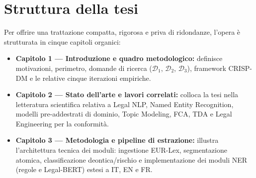 \documentclass[12pt,a4paper,oneside]{report}
\begin{document}
\clearpage

\section{Struttura della tesi}
Per offrire una trattazione compatta, rigorosa e priva di ridondanze, l'opera è strutturata in cinque capitoli organici:

\begin{itemize}
    \item \textbf{Capitolo 1 — Introduzione e quadro metodologico:} definisce motivazioni, perimetro, domande di ricerca ($\mathcal{D}_1$, $\mathcal{D}_2$, $\mathcal{D}_3$), framework CRISP-DM e le relative cinque iterazioni empiriche.
    
    \item \textbf{Capitolo 2 — Stato dell'arte e lavori correlati:} colloca la tesi nella letteratura scientifica relativa a Legal NLP, Named Entity Recognition, modelli pre-addestrati di dominio, Topic Modeling, FCA, TDA e Legal Engineering per la conformità.
    
    \item \textbf{Capitolo 3 — Metodologia e pipeline di estrazione:} illustra l'architettura tecnica dei moduli: ingestione EUR-Lex, segmentazione atomica, classificazione deontica/rischio e implementazione dei moduli NER (regole e Legal-BERT) estesi a IT, EN e FR.
    

\end{itemize}
\end{document}
